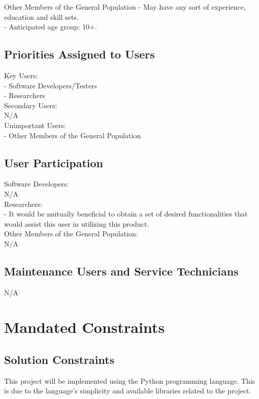 \documentclass[titlepage]{article}
\begin{document}
Other Members of the General Population
- May have any sort of experience, education and skill sets.\\
- Anticipated age group: 10+.\\


\subsection*{Priorities Assigned to Users}
Key Users:\\
- Software Developers/Testers\\
- Researchers\\

Secondary Users:\\
N/A\\

Unimportant Users:\\
- Other Members of the General Population\\

\subsection*{User Participation}
Software Developers:\\
N/A\\

Researchers:\\
- It would be mutually beneficial to obtain a set of desired functionalities that would assist this user in utilizing this product.\\

Other Members of the General Population:\\
N/A

\subsection*{Maintenance Users and Service Technicians}
N/A


\section{Mandated Constraints}

\subsection*{Solution Constraints}
	This project will be implemented using the Python programming language. This is due to the language’s simplicity and available libraries related to the project.
\end{document}
